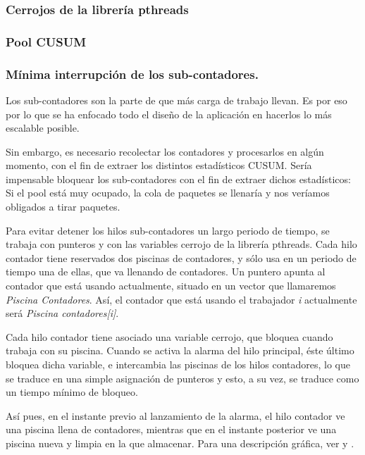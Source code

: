 \subsubsection{Cerrojos de la librería \gls{pthreads}}
\subsubsection{Pool CUSUM}
\subsubsection{Mínima interrupción de los sub-contadores.}
Los sub-contadores son la parte de \redborderddos que más carga de trabajo llevan. Es por eso por lo que se ha enfocado 
todo el diseño de la aplicación en hacerlos lo más escalable posible.

Sin embargo, es necesario recolectar los contadores y procesarlos en algún momento, con el fin de extraer los distintos 
estadísticos CUSUM. Sería impensable bloquear los sub-contadores con el fin de extraer dichos estadísticos: Si el pool 
está muy ocupado, la cola de paquetes se llenaría y nos veríamos obligados a tirar paquetes.

Para evitar detener los hilos sub-contadores un largo periodo de tiempo, se trabaja con punteros y con las variables 
cerrojo de la librería \gls{pthreads}. Cada hilo contador tiene reservados dos piscinas de contadores, y sólo usa en un 
periodo de tiempo una de ellas, que va llenando de contadores. Un puntero apunta al contador que está usando 
actualmente, situado en un vector que llamaremos \emph{Piscina Contadores}. Así, el contador que está usando el 
trabajador \emph{i} actualmente será \emph{Piscina contadores[i]}.

Cada hilo contador tiene asociado una variable cerrojo, que bloquea cuando trabaja con su piscina. Cuando se activa la 
alarma del hilo principal, éste último bloquea dicha variable, e intercambia las piscinas de los hilos contadores, 
lo que se traduce en una simple asignación de punteros y esto, a su vez, se traduce como un tiempo mínimo de bloqueo.

Así pues, en el instante previo al lanzamiento de la alarma, el hilo contador ve una piscina llena de contadores, 
mientras que en el instante posterior ve una piscina nueva y limpia en la que almacenar. Para una descripción 
gráfica, ver  y .

